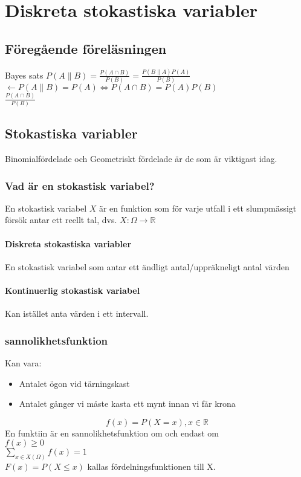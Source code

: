\chapter{Diskreta stokastiska variabler}

\section{Föregående föreläsningen}
Bayes sats
$P(A\|B)=\frac{P(A\cap B)}{P(B)}=\frac{P(B\|A)P(A)}{P(B)}$
\\
$\leftarrow P(A\|B)=P(A)\Leftrightarrow P(A\cap B)=P(A)P(B)$\\
$\frac{P(A\cap B)}{P(B)}$

\section{Stokastiska variabler}
Binomialfördelade och Geometriskt fördelade är de som är viktigast idag.\\
\subsection{Vad är en stokastisk variabel?}
En stokastisk variabel $X$ är en funktion som för varje utfall i ett slumpmässigt försök antar ett reellt tal, dvs. $X:\Omega\rightarrow\mathbb{R}$
\\
\subsubsection{Diskreta stokastiska variabler}
En stokastisk variabel som antar ett ändligt antal/uppräkneligt antal värden
\subsubsection{Kontinuerlig stokastisk variabel}
Kan istället anta värden i ett intervall.
\subsection{sannolikhetsfunktion}
Kan vara:
\begin{itemize}
\item Antalet ögon vid tärningskast
\item Antalet gånger vi måste kasta ett mynt innan vi får krona
\end{itemize}

$$f(x)=P(X =x),x\in\mathbb{R}$$
En funktiin är en sannolikhetsfunktion om och endast om\\
$f(x)\geq0$
\\
$\sum_{x\in X(\Omega)}f(x)=1$\\
$F(x)=P(X\leq x)$ kallas fördelningsfunktionen till X.